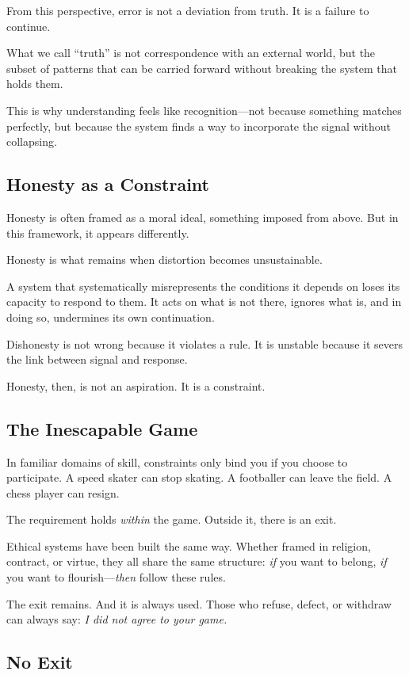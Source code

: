 \documentclass{article}
\begin{document}
From this perspective, error is not a deviation from truth. It is a failure to continue.

What we call ``truth'' is not correspondence with an external world, but the subset of patterns that can be carried forward without breaking the system that holds them.

This is why understanding feels like recognition—not because something matches perfectly, but because the system finds a way to incorporate the signal without collapsing.

\subsection*{Honesty as a Constraint}

Honesty is often framed as a moral ideal, something imposed from above. But in this framework, it appears differently.

Honesty is what remains when distortion becomes unsustainable.

A system that systematically misrepresents the conditions it depends on loses its capacity to respond to them. It acts on what is not there, ignores what is, and in doing so, undermines its own continuation.

Dishonesty is not wrong because it violates a rule. It is unstable because it severs the link between signal and response.

Honesty, then, is not an aspiration. It is a constraint.

\subsection*{The Inescapable Game}

In familiar domains of skill, constraints only bind you if you choose to participate. A speed skater can stop skating. A footballer can leave the field. A chess player can resign.

The requirement holds \textit{within} the game. Outside it, there is an exit.

Ethical systems have been built the same way. Whether framed in religion, contract, or virtue, they all share the same structure: \textit{if} you want to belong, \textit{if} you want to flourish—\textit{then} follow these rules.

The exit remains. And it is always used. Those who refuse, defect, or withdraw can always say: \textit{I did not agree to your game.}

\subsection*{No Exit}
\end{document}
